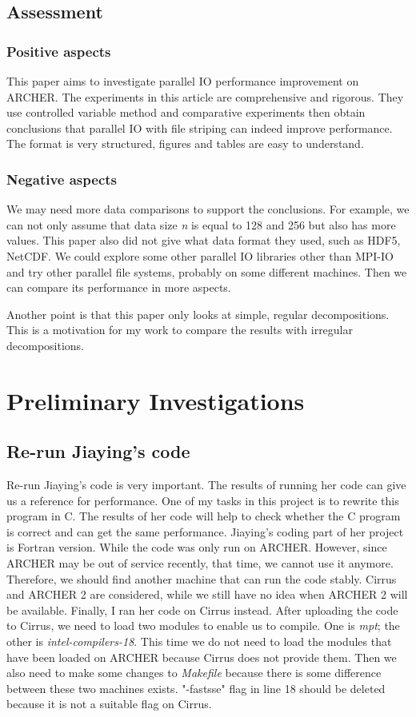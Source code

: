 \documentclass{article}
\begin{document}
\subsection{Assessment}
\subsubsection{Positive aspects}
This paper aims to investigate parallel IO performance improvement on ARCHER. The experiments in this article are comprehensive and rigorous. They use controlled variable method and comparative experiments then obtain conclusions that parallel IO with file striping can indeed improve performance.
The format is very structured, figures and tables are easy to understand.

\subsubsection{Negative aspects}
We may need more data comparisons to support the conclusions. For example, we can not only assume that data size \textit{n} is equal to 128 and 256 but also has more values.
This paper also did not give what data format they used, such as HDF5, NetCDF.
We could explore some other parallel IO libraries other than MPI-IO and try other parallel file systems, probably on some different machines. Then we can compare its performance in more aspects.

Another point is that this paper only looks at simple, regular decompositions. This is a motivation for my work to compare the results with irregular decompositions.

\section{Preliminary Investigations}
\subsection{Re-run Jiaying's code}
Re-run Jiaying's code is very important. The results of running her code can give us a reference for performance. One of my tasks in this project is to rewrite this program in C. The results of her code will help to check whether the C program is correct and can get the same performance.
Jiaying's coding part of her project is Fortran version. While the code was only run on ARCHER. However, since ARCHER may be out of service recently, that time, we cannot use it anymore. Therefore, we should find another machine that can run the code stably. Cirrus and ARCHER 2 are considered, while we still have no idea when ARCHER 2 will be available. Finally, I ran her code on Cirrus instead.
After uploading the code to Cirrus, we need to load two modules to enable us to compile. One is \textit{mpt}; the other is \textit{intel-compilers-18}. This time we do not need to load the modules that have been loaded on ARCHER because Cirrus does not provide them.
Then we also need to make some changes to \textit{Makefile} because there is some difference between these two machines exists. "-fastsse" flag in line 18 should be deleted because it is not a suitable flag on Cirrus.
\end{document}
